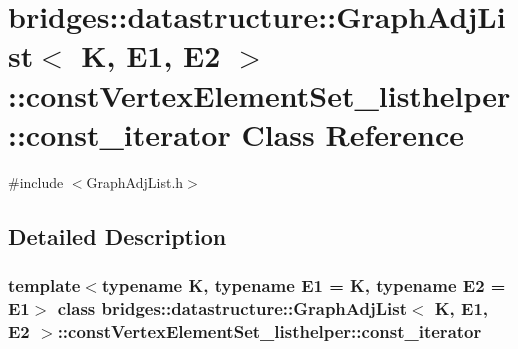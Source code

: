 \hypertarget{classbridges_1_1datastructure_1_1_graph_adj_list_1_1const_vertex_element_set__listhelper_1_1const__iterator}{}\section{bridges\+::datastructure\+::Graph\+Adj\+List$<$ K, E1, E2 $>$\+::const\+Vertex\+Element\+Set\+\_\+listhelper\+::const\+\_\+iterator Class Reference}
\label{classbridges_1_1datastructure_1_1_graph_adj_list_1_1const_vertex_element_set__listhelper_1_1const__iterator}


{\ttfamily \#include $<$Graph\+Adj\+List.\+h$>$}



\subsection{Detailed Description}
\subsubsection*{template$<$typename K, typename E1 = K, typename E2 = E1$>$\newline
class bridges\+::datastructure\+::\+Graph\+Adj\+List$<$ K, E1, E2 $>$\+::const\+Vertex\+Element\+Set\+\_\+listhelper\+::const\+\_\+iterator}

